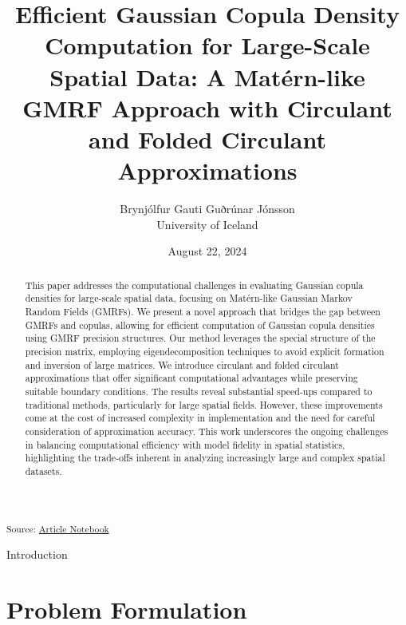 \documentclass[
  12pt]{article}
\begin{document}
\def\spacingset#1{\renewcommand{\baselinestretch}%
{#1}\small\normalsize} \spacingset{1}



\date{August 22, 2024}
\title{\bf Efficient Gaussian Copula Density Computation for Large-Scale
Spatial Data: A Matérn-like GMRF Approach with Circulant and Folded
Circulant Approximations}
\author{
Brynjólfur Gauti Guðrúnar Jónsson\\
University of Iceland\\
}
\maketitle

\bigskip
\bigskip
\begin{abstract}
This paper addresses the computational challenges in evaluating Gaussian
copula densities for large-scale spatial data, focusing on Matérn-like
Gaussian Markov Random Fields (GMRFs). We present a novel approach that
bridges the gap between GMRFs and copulas, allowing for efficient
computation of Gaussian copula densities using GMRF precision
structures. Our method leverages the special structure of the precision
matrix, employing eigendecomposition techniques to avoid explicit
formation and inversion of large matrices. We introduce circulant and
folded circulant approximations that offer significant computational
advantages while preserving suitable boundary conditions. The results
reveal substantial speed-ups compared to traditional methods,
particularly for large spatial fields. However, these improvements come
at the cost of increased complexity in implementation and the need for
careful consideration of approximation accuracy. This work underscores
the ongoing challenges in balancing computational efficiency with model
fidelity in spatial statistics, highlighting the trade-offs inherent in
analyzing increasingly large and complex spatial datasets.
\end{abstract}


\newpage
\spacingset{1.9} %


\textsubscript{Source:
\href{https://bgautijonsson.github.io/MaternEigenPaper/index.qmd.html}{Article
Notebook}}

Introduction

\section{Problem Formulation}\label{problem-formulation}
\end{document}
